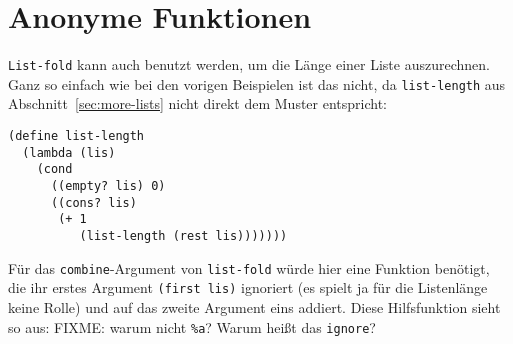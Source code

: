 \section{Anonyme Funktionen}\label{sec:anonymous-procedures}

\texttt{List-fold} kann auch benutzt werden, um die Länge einer Liste
auszurechnen.  Ganz so einfach wie bei den vorigen Beispielen ist das
nicht, da \texttt{list-length} aus
Abschnitt~\ref{sec:more-lists} nicht direkt dem Muster entspricht:
%
\begin{lstlisting}
(define list-length
  (lambda (lis)
    (cond
      ((empty? lis) 0)
      ((cons? lis) 
       (+ 1 
          (list-length (rest lis)))))))
\end{lstlisting}
%
Für das \texttt{combine}-Argument von \texttt{list-fold}
würde hier eine Funktion benötigt, die ihr erstes
Argument \texttt{(first lis)} ignoriert (es spielt ja für die Listenlänge
keine Rolle) und auf das zweite Argument eins addiert.  Diese
Hilfsfunktion sieht so aus:
%
FIXME: warum nicht \texttt{\%a}?  Warum heißt das \texttt{ignore}?

